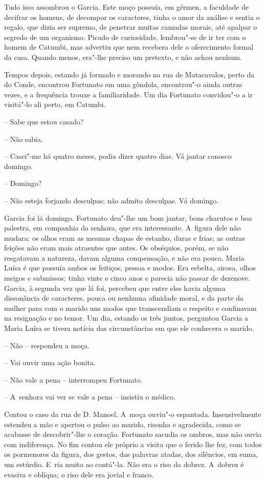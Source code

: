 Tudo isso assombrou o Garcia. Este moço possuía, em gérmen, a faculdade
de decifrar os homens, de decompor os caracteres, tinha o amor da
análise e sentia o regalo, que dizia ser supremo, de penetrar muitas
camadas morais, até apalpar o segredo de um organismo. Picado de
curiosidade, lembrou"-se de ir ter com o homem de Catumbi, mas advertiu
que nem recebera dele o oferecimento formal da casa. Quando menos,
era"-lhe preciso um pretexto, e não achou nenhum.

Tempos depois, estando já formado e morando na rua de Matacavalos, perto
da do Conde, encontrou Fortunato em uma gôndola, encontrou"-o ainda
outras vezes, e a frequência trouxe a familiaridade. Um dia Fortunato
convidou"-o a ir visitá"-lo ali perto, em Catumbi.

-- Sabe que estou casado?

-- Não sabia.

-- Casei"-me há quatro meses, podia dizer quatro dias. Vá jantar conosco
domingo.

-- Domingo?

-- Não esteja forjando desculpas; não admito desculpas. Vá domingo.

Garcia foi lá domingo. Fortunato deu"-lhe um bom jantar, bons charutos e
boa palestra, em companhia da senhora, que era interessante. A~figura
dele não mudara; os olhos eram as mesmas chapas de estanho, duras e
frias; as outras feições não eram mais atraentes que antes. Os
obséquios, porém, se não resgatavam a natureza, davam alguma
compensação, e não era pouco. Maria Luísa é que possuía ambos os
feitiços, pessoa e modos. Era esbelta, airosa, olhos meigos e submissos;
tinha vinte e cinco anos e parecia não passar de dezenove. Garcia, à
segunda vez que lá foi, percebeu que entre eles havia alguma dissonância
de caracteres, pouca ou nenhuma afinidade moral, e da parte da mulher
para com o marido uns modos que transcendiam o respeito e confinavam na
resignação e no temor. Um dia, estando os três juntos, perguntou Garcia
a Maria Luísa se tivera notícia das circunstâncias em que ele conhecera
o marido.

-- Não -- respondeu a moça.

-- Vai ouvir uma ação bonita.

-- Não vale a pena -- interrompeu Fortunato.

-- A~senhora vai ver se vale a pena -- insistiu o médico.

Contou o caso da rua de D. Manoel. A~moça ouviu"-o espantada.
Insensivelmente estendeu a mão e apertou o pulso ao marido, risonha e
agradecida, como se acabasse de descobrir"-lhe o coração. Fortunato
sacudia os ombros, mas não ouvia com indiferença. No fim contou ele
próprio a visita que o ferido lhe fez, com todos os pormenores da
figura, dos gestos, das palavras atadas, dos silêncios, em suma, um
estúrdio. E~ria muito ao contá"-la. Não era o riso da dobrez. A~dobrez é
evasiva e oblíqua; o riso dele era jovial e franco.

